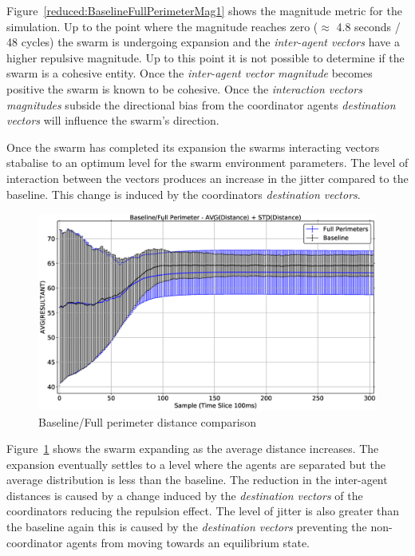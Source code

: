 Figure~\ref{reduced:BaselineFullPerimeterMag1} shows the magnitude metric for the simulation. Up to the point where the magnitude reaches zero ($\approx$ 4.8 seconds / 48 cycles) the swarm is undergoing expansion and the \textit{inter-agent vectors} have a higher repulsive magnitude. Up to this point it is not possible to determine if the swarm is a cohesive entity. Once the \textit{inter-agent vector magnitude} becomes positive the swarm is known to be cohesive. Once the \textit{interaction vectors magnitudes} subside the directional bias from the coordinator agents \textit{destination vectors} will influence the swarm's direction. 

Once the swarm has completed its expansion the swarms interacting vectors stabalise to an optimum level for the swarm environment parameters. The level of interaction between the vectors produces an increase in the jitter compared to the baseline. This change is induced by the coordinators \textit{destination vectors}.

\begin{figure}[H]
\begin{center}
\includegraphics[width=14cm]{CHAPTER-6/figures/BaselineFullPerimeterDist1}
\end{center}
\caption{Baseline/Full perimeter distance comparison\label{reduced:BaselineFullPerimeterDist1}}
\end{figure}

Figure~\ref{reduced:BaselineFullPerimeterDist1} shows the swarm expanding as the average distance increases. The expansion eventually settles to a level where the agents are separated but the average distribution is less than the baseline. The reduction in the inter-agent distances is caused by a change induced by the \textit{destination vectors} of the coordinators reducing the repulsion effect. The level of jitter is also greater than the baseline again this is caused by the \textit{destination vectors} preventing the non-coordinator agents from moving towards an equilibrium state.

